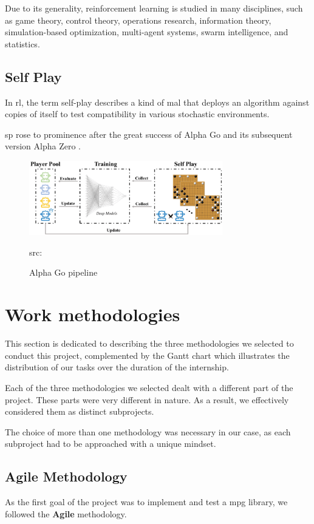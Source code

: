 Due to its generality, reinforcement learning is studied in many disciplines, such as game theory, control theory, operations research, information theory, simulation-based optimization, multi-agent systems, swarm intelligence, and statistics. 
\subsection{Self Play}
In \acrfull{rl}, the term self-play describes a kind of \acrfull{mal} that
deploys an algorithm against copies of itself to test compatibility in various stochastic environments.

\acrfull{sp} rose to prominence after the great success of Alpha Go \cite{AlphaGo} and its subsequent version Alpha Zero \cite{AlphaZero}.

\begin{figure}[H]
	\centering
	\includegraphics[width=0.75\textwidth]{Figures/AlphaZeroSelfPlay.png}
	\caption{Alpha Go pipeline}
	\scriptsize src: 
\end{figure}
\FloatBarrier

\section{Work methodologies}
This section is dedicated to describing the three methodologies we selected to conduct this
project, complemented by the Gantt chart which illustrates the distribution of our tasks
over the duration of the internship.

Each of the three methodologies we selected dealt with a different part of the project. These parts were very different in nature. As a result, we effectively considered them as distinct subprojects.

The choice of more than one methodology was necessary in our case, as each subproject had to be approached with a unique mindset.

\subsection{Agile Methodology}
As the first goal of the project was to implement and test a \acrshort{mpg} library, we followed the \textbf{Agile} methodology.


